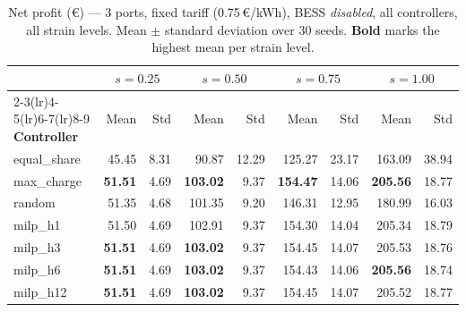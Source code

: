 \begin{table}[!htb]
\centering
\caption{Net profit (€) — 3 ports, fixed tariff (0.75\,€/kWh),
         BESS \emph{disabled}, all controllers, all strain levels.
         Mean $\pm$ standard deviation over 30 seeds.
         \textbf{Bold} marks the highest mean per strain level.}
\label{tab:gc_fixed_nobess_ms_3p}
\setlength{\tabcolsep}{4.5pt}
\begin{tabular}{l rr rr rr rr}
\toprule
 & \multicolumn{2}{c}{$s=0.25$}
 & \multicolumn{2}{c}{$s=0.50$}
 & \multicolumn{2}{c}{$s=0.75$}
 & \multicolumn{2}{c}{$s=1.00$} \\
\cmidrule(lr){2-3}\cmidrule(lr){4-5}\cmidrule(lr){6-7}\cmidrule(lr){8-9}
\textbf{Controller} & Mean & Std & Mean & Std & Mean & Std & Mean & Std \\
\midrule
equal\_share &  45.45 &  8.31 &  90.87 & 12.29 & 125.27 & 23.17 & 163.09 & 38.94 \\
max\_charge  & \textbf{51.51} &  4.69 & \textbf{103.02} &  9.37 & \textbf{154.47} & 14.06 & \textbf{205.56} & 18.77 \\
random       &  51.35 &  4.68 & 101.35 &  9.20 & 146.31 & 12.95 & 180.99 & 16.03 \\
milp\_h1     &  51.50 &  4.69 & 102.91 &  9.37 & 154.30 & 14.04 & 205.34 & 18.79 \\
milp\_h3     & \textbf{51.51} &  4.69 & \textbf{103.02} &  9.37 & 154.45 & 14.07 & 205.53 & 18.76 \\
milp\_h6     & \textbf{51.51} &  4.69 & \textbf{103.02} &  9.37 & 154.43 & 14.06 & \textbf{205.56} & 18.74 \\
milp\_h12    & \textbf{51.51} &  4.69 & \textbf{103.02} &  9.37 & 154.45 & 14.07 & 205.52 & 18.77 \\
\bottomrule
\end{tabular}
\end{table}

